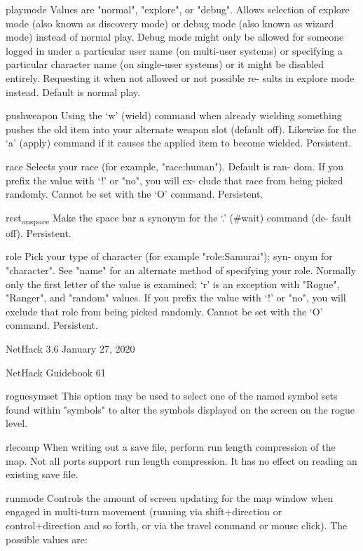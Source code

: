 \documentclass[11pt]{article}
\begin{document}
playmode
 Values are "normal", "explore", or "debug". Allows selection
 of explore mode (also known as discovery mode) or debug mode
 (also known as wizard mode) instead of normal play. Debug mode
 might only be allowed for someone logged in under a particular
 user name (on multi-user systems) or specifying a particular
 character name (on single-user systems) or it might be disabled
 entirely.  Requesting it when not allowed or not possible re-
 sults in explore mode instead. Default is normal play.

pushweapon
 Using the `w' (wield) command when already wielding something
 pushes the old item into your alternate weapon slot (default
 off). Likewise for the `a' (apply) command if it causes the
 applied item to become wielded. Persistent.

race
 Selects your race (for example, "race:human"). Default is ran-
 dom. If you prefix the value with `!' or "no", you will ex-
 clude that race from being picked randomly. Cannot be set with
 the `O' command. Persistent.

rest\textsubscript{on}\textsubscript{space}
 Make the space bar a synonym for the `.' (\#wait) command (de-
 fault off). Persistent.

role
 Pick your type of character (for example "role:Samurai"); syn-
 onym for "character". See "name" for an alternate method of
 specifying your role.  Normally only the first letter of the
 value is examined; `r' is an exception with "Rogue", "Ranger",
 and "random" values. If you prefix the value with `!' or "no",
 you will exclude that role from being picked randomly.  Cannot
 be set with the `O' command. Persistent.


NetHack 3.6                   January 27, 2020





NetHack Guidebook                       61



roguesymset
 This option may be used to select one of the named symbol sets
 found within "symbols" to alter the symbols displayed on the
 screen on the rogue level.

rlecomp
 When writing out a save file, perform run length compression of
 the map. Not all ports support run length compression. It has
 no effect on reading an existing save file.

runmode
 Controls the amount of screen updating for the map window when
 engaged in multi-turn movement (running via shift+direction or
 control+direction and so forth, or via the travel command or
 mouse click). The possible values are:
\end{document}
